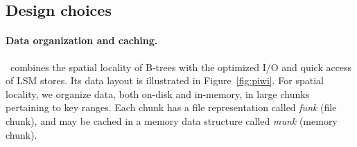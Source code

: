 \subsection{Design choices}



\paragraph{Data organization and caching.}

\sys\  combines the spatial locality of B-trees  with the optimized I/O and quick access of LSM stores. 
Its data layout is illustrated in Figure~\ref{fig:piwi}. 
For spatial locality, we organize data, both on-disk and in-memory, in large chunks pertaining to  key ranges.  
Each chunk has a file representation called  \emph{funk} (file chunk), and may be cached in a  memory data structure called \emph{munk} (memory chunk).



